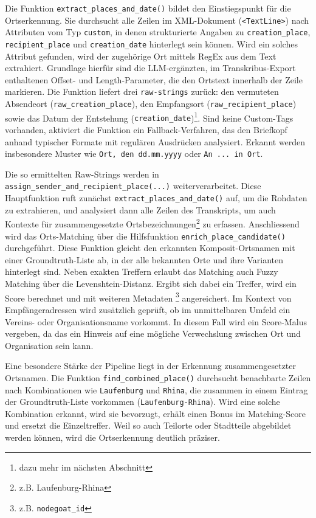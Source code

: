 \documentclass[12pt, a4paper, ngerman, bidi=default]{article}
\newcommand{\code}[1]{\colorbox{VeryLightGray}{\texttt{#1}}} %
\begin{document}
Die Funktion \code{extract\_places\_and\_date()} bildet den Einstiegspunkt für die Ortserkennung. Sie durchsucht alle Zeilen im XML-Dokument (\code{<TextLine>}) nach Attributen vom Typ \texttt{custom}, in denen strukturierte Angaben zu \code{creation\_place}, \code{recipient\_place} und \code{creation\_date} hinterlegt sein können. Wird ein solches Attribut gefunden, wird der zugehörige Ort mittels RegEx aus dem Text extrahiert. Grundlage hierfür sind die LLM-ergänzten, im Transkribus-Export enthaltenen Offset- und Length-Parameter, die den Ortstext innerhalb der Zeile markieren. Die Funktion liefert drei \code{raw-strings} zurück: den vermuteten Absendeort (\code{raw\_creation\_place}), den Empfangsort (\code{raw\_recipient\_place}) sowie das Datum der Entstehung (\code{creation\_date})\footnote{dazu mehr im nächsten Abschnitt}. Sind keine Custom-Tags vorhanden, aktiviert die Funktion ein Fallback-Verfahren, das den Briefkopf anhand typischer Formate mit regulären Ausdrücken analysiert. Erkannt werden insbesondere Muster wie \texttt{Ort, den dd.mm.yyyy} oder \texttt{An ... in Ort}.

Die so ermittelten Raw-Strings werden in \code{assign\_sender\_and\_recipient\_place(...)} weiterverarbeitet. Diese Hauptfunktion ruft zunächst \code{extract\_places\_and\_date()} auf, um die Rohdaten zu extrahieren, und analysiert dann alle Zeilen des Transkripts, um auch Kontexte für zusammengesetzte Ortsbezeichnungen\footnote{z.B. Laufenburg-Rhina} zu erfassen. Anschliessend wird das Orts-Matching über die Hilfsfunktion \code{enrich\_place\_candidate()} durchgeführt. Diese Funktion gleicht den erkannten Komposit-Ortsnamen mit einer Groundtruth-Liste ab, in der alle bekannten Orte und ihre Varianten hinterlegt sind. Neben exakten Treffern erlaubt das Matching auch Fuzzy Matching über die Levenshtein-Distanz. Ergibt sich dabei ein Treffer, wird ein Score berechnet und mit weiteren Metadaten \footnote{z.B. \code{nodegoat\_id}} angereichert. Im Kontext von Empfängeradressen wird zusätzlich geprüft, ob im unmittelbaren Umfeld ein Vereins- oder Organisationsname vorkommt. In diesem Fall wird ein Score-Malus vergeben, da  das ein Hinweis auf eine mögliche Verwechslung zwischen Ort und Organisation sein kann.

Eine besondere Stärke der Pipeline liegt in der Erkennung zusammengesetzter Ortsnamen. Die Funktion \code{find\_combined\_place()} durchsucht benachbarte Zeilen nach Kombinationen wie \texttt{Laufenburg} und \texttt{Rhina}, die zusammen in einem Eintrag der Groundtruth-Liste vorkommen (\texttt{Laufenburg-Rhina}). Wird eine solche Kombination erkannt, wird sie bevorzugt, erhält einen Bonus im Matching-Score und ersetzt die Einzeltreffer. Weil so auch Teilorte oder Stadtteile abgebildet werden können, wird die Ortserkennung deutlich präziser.
\end{document}
